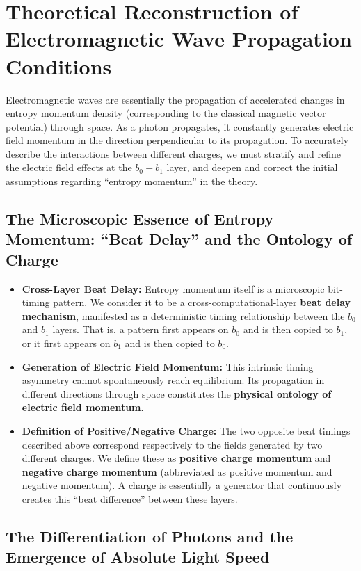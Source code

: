 \documentclass[12pt, a4paper]{article}
\begin{document}
\section{Theoretical Reconstruction of Electromagnetic Wave Propagation Conditions}

Electromagnetic waves are essentially the propagation of accelerated changes in entropy momentum density (corresponding to the classical magnetic vector potential) through space. As a photon propagates, it constantly generates electric field momentum in the direction perpendicular to its propagation. To accurately describe the interactions between different charges, we must stratify and refine the electric field effects at the $b_0-b_1$ layer, and deepen and correct the initial assumptions regarding ``entropy momentum'' in the theory.

\subsection{The Microscopic Essence of Entropy Momentum: ``Beat Delay'' and the Ontology of Charge}

\begin{itemize}
    \item \textbf{Cross-Layer Beat Delay:} Entropy momentum itself is a microscopic bit-timing pattern. We consider it to be a cross-computational-layer \textbf{beat delay mechanism}, manifested as a deterministic timing relationship between the $b_0$ and $b_1$ layers. That is, a pattern first appears on $b_0$ and is then copied to $b_1$, or it first appears on $b_1$ and is then copied to $b_0$.
    \item \textbf{Generation of Electric Field Momentum:} This intrinsic timing asymmetry cannot spontaneously reach equilibrium. Its propagation in different directions through space constitutes the \textbf{physical ontology of electric field momentum}.
    \item \textbf{Definition of Positive/Negative Charge:} The two opposite beat timings described above correspond respectively to the fields generated by two different charges. We define these as \textbf{positive charge momentum} and \textbf{negative charge momentum} (abbreviated as positive momentum and negative momentum). A charge is essentially a generator that continuously creates this ``beat difference'' between these layers.
\end{itemize}

\subsection{The Differentiation of Photons and the Emergence of Absolute Light Speed}
\end{document}
